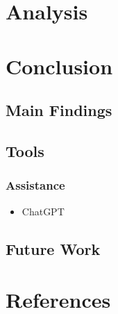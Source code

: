 \documentclass{article}
\begin{document}
\section{Analysis}

\section{Conclusion}
\subsection{Main Findings}
\subsection{Tools}
\subsubsection{Assistance}
\begin{itemize}
    \item ChatGPT
\end{itemize}
\subsection{Future Work}
\section{References}

\end{document}
